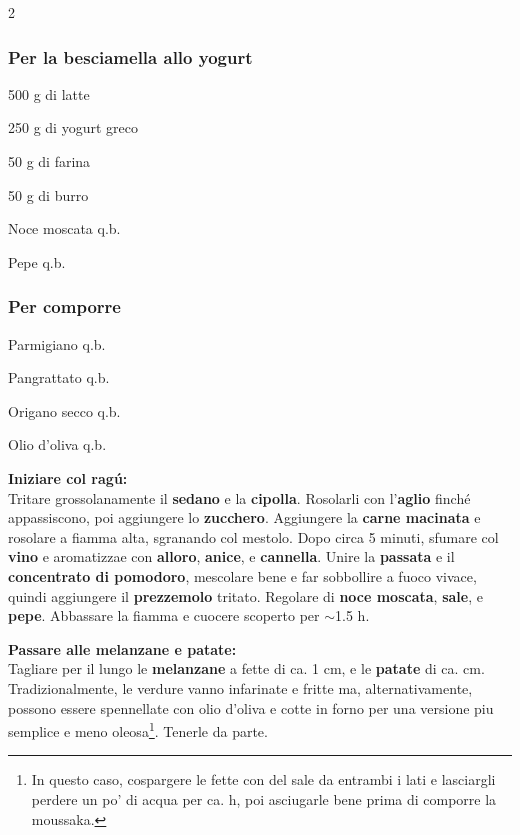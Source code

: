\begin{multicols}{2}
	\subsubsection*{Per la besciamella allo yogurt}
	\begin{ingredients}
		\item 500 g di latte
		\item 250 g di yogurt greco
		\item 50 g di farina
		\item 50 g di burro
		\item Noce moscata q.b.
		\item Pepe q.b.
	\end{ingredients}
	
	\subsubsection*{Per comporre}
	\begin{ingredients}
		\item Parmigiano q.b.
		\item Pangrattato q.b.
		\item Origano secco q.b.
		\item Olio d'oliva q.b.
	\end{ingredients}
	
\end{multicols}

\textbf{Iniziare col ragú:} \\
Tritare grossolanamente il \textbf{sedano} e la \textbf{cipolla}.
Rosolarli con l'\textbf{aglio} finché appassiscono, poi aggiungere lo \textbf{zucchero}.
Aggiungere la \textbf{carne macinata} e rosolare a fiamma alta, sgranando col mestolo. 
Dopo circa 5 minuti, sfumare col \textbf{vino} e aromatizzae con \textbf{alloro}, \textbf{anice}, e \textbf{cannella}.
Unire la \textbf{passata} e il \textbf{concentrato di pomodoro}, mescolare bene e far sobbollire a fuoco vivace, quindi aggiungere il \textbf{prezzemolo} tritato.
Regolare di \textbf{noce moscata}, \textbf{sale}, e \textbf{pepe}. 
Abbassare la fiamma e cuocere scoperto per $\sim$1.5 h.

\textbf{Passare alle melanzane e patate:} \\ 
Tagliare per il lungo le \textbf{melanzane} a fette di ca. 1 cm, e le \textbf{patate} di ca.  cm. 
Tradizionalmente, le verdure vanno infarinate e fritte ma, alternativamente, possono essere spennellate con olio d'oliva e cotte in forno per una versione piu semplice e meno oleosa\footnote{In questo caso, cospargere le fette con del sale da entrambi i lati e lasciargli perdere un po' di acqua per ca. h, poi asciugarle bene prima di comporre la moussaka.}. 
Tenerle da parte.

